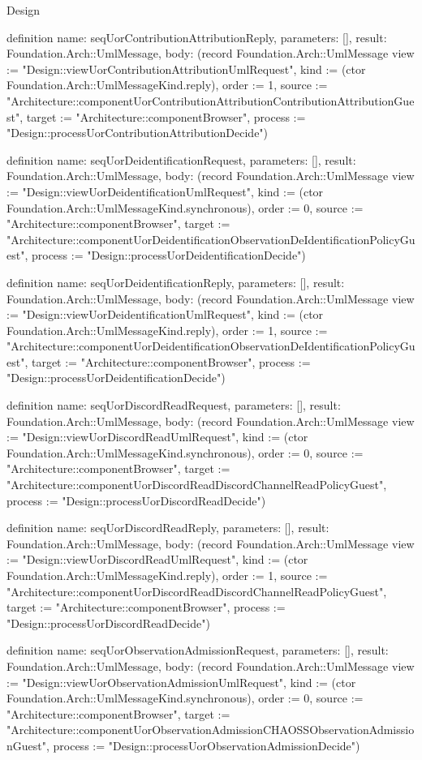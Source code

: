 \begin{lexlean}{Design}
\begin{semanticmodule}
definition{
  name: seqUorContributionAttributionReply,
  parameters: [],
  result: Foundation.Arch::UmlMessage,
  body: (record Foundation.Arch::UmlMessage {view := "Design::viewUorContributionAttributionUmlRequest", kind := (ctor Foundation.Arch::UmlMessageKind.reply), order := 1, source := "Architecture::componentUorContributionAttributionContributionAttributionGuest", target := "Architecture::componentBrowser", process := "Design::processUorContributionAttributionDecide"})
}

definition{
  name: seqUorDeidentificationRequest,
  parameters: [],
  result: Foundation.Arch::UmlMessage,
  body: (record Foundation.Arch::UmlMessage {view := "Design::viewUorDeidentificationUmlRequest", kind := (ctor Foundation.Arch::UmlMessageKind.synchronous), order := 0, source := "Architecture::componentBrowser", target := "Architecture::componentUorDeidentificationObservationDeIdentificationPolicyGuest", process := "Design::processUorDeidentificationDecide"})
}

definition{
  name: seqUorDeidentificationReply,
  parameters: [],
  result: Foundation.Arch::UmlMessage,
  body: (record Foundation.Arch::UmlMessage {view := "Design::viewUorDeidentificationUmlRequest", kind := (ctor Foundation.Arch::UmlMessageKind.reply), order := 1, source := "Architecture::componentUorDeidentificationObservationDeIdentificationPolicyGuest", target := "Architecture::componentBrowser", process := "Design::processUorDeidentificationDecide"})
}

definition{
  name: seqUorDiscordReadRequest,
  parameters: [],
  result: Foundation.Arch::UmlMessage,
  body: (record Foundation.Arch::UmlMessage {view := "Design::viewUorDiscordReadUmlRequest", kind := (ctor Foundation.Arch::UmlMessageKind.synchronous), order := 0, source := "Architecture::componentBrowser", target := "Architecture::componentUorDiscordReadDiscordChannelReadPolicyGuest", process := "Design::processUorDiscordReadDecide"})
}

definition{
  name: seqUorDiscordReadReply,
  parameters: [],
  result: Foundation.Arch::UmlMessage,
  body: (record Foundation.Arch::UmlMessage {view := "Design::viewUorDiscordReadUmlRequest", kind := (ctor Foundation.Arch::UmlMessageKind.reply), order := 1, source := "Architecture::componentUorDiscordReadDiscordChannelReadPolicyGuest", target := "Architecture::componentBrowser", process := "Design::processUorDiscordReadDecide"})
}

definition{
  name: seqUorObservationAdmissionRequest,
  parameters: [],
  result: Foundation.Arch::UmlMessage,
  body: (record Foundation.Arch::UmlMessage {view := "Design::viewUorObservationAdmissionUmlRequest", kind := (ctor Foundation.Arch::UmlMessageKind.synchronous), order := 0, source := "Architecture::componentBrowser", target := "Architecture::componentUorObservationAdmissionCHAOSSObservationAdmissionGuest", process := "Design::processUorObservationAdmissionDecide"})
}


\end{semanticmodule}
\end{lexlean}
